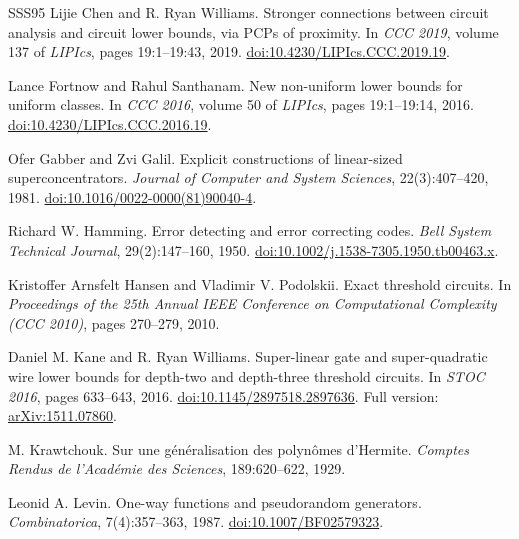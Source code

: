 \documentclass[11pt,letterpaper]{article}
\theoremstyle{definition}
\theoremstyle{remark}
\begin{document}
\begin{thebibliography}{SSS95}
Lijie Chen and R. Ryan Williams.
\newblock Stronger connections between circuit analysis and circuit lower bounds, via PCPs of proximity.
\newblock In \emph{CCC 2019}, volume 137 of \emph{LIPIcs}, pages 19:1--19:43, 2019.
\newblock \href{https://doi.org/10.4230/LIPIcs.CCC.2019.19}{doi:10.4230/LIPIcs.CCC.2019.19}.

Lance Fortnow and Rahul Santhanam.
\newblock New non-uniform lower bounds for uniform classes.
\newblock In \emph{CCC 2016}, volume 50 of \emph{LIPIcs}, pages 19:1--19:14, 2016.
\newblock \href{https://doi.org/10.4230/LIPIcs.CCC.2016.19}{doi:10.4230/LIPIcs.CCC.2016.19}.

Ofer Gabber and Zvi Galil.
\newblock Explicit constructions of linear-sized superconcentrators.
\newblock \emph{Journal of Computer and System Sciences}, 22(3):407--420, 1981.
\newblock \href{https://doi.org/10.1016/0022-0000(81)90040-4}{doi:10.1016/0022-0000(81)90040-4}.

Richard W. Hamming.
\newblock Error detecting and error correcting codes.
\newblock \emph{Bell System Technical Journal}, 29(2):147--160, 1950.
\newblock \href{https://doi.org/10.1002/j.1538-7305.1950.tb00463.x}{doi:10.1002/j.1538-7305.1950.tb00463.x}.

Kristoffer Arnsfelt Hansen and Vladimir V. Podolskii.
\newblock Exact threshold circuits.
\newblock In \emph{Proceedings of the 25th Annual IEEE Conference on
Computational Complexity (CCC 2010)}, pages 270--279, 2010.

Daniel M. Kane and R. Ryan Williams.
\newblock Super-linear gate and super-quadratic wire lower bounds for depth-two and depth-three threshold circuits.
\newblock In \emph{STOC 2016}, pages 633--643, 2016.
\newblock \href{https://doi.org/10.1145/2897518.2897636}{doi:10.1145/2897518.2897636}.
Full version: \href{https://arxiv.org/abs/1511.07860}{arXiv:1511.07860}.

M. Krawtchouk.
\newblock Sur une g\'en\'eralisation des polyn\^omes d'Hermite.
\newblock \emph{Comptes Rendus de l'Acad\'emie des Sciences}, 189:620--622, 1929.

Leonid A. Levin.
\newblock One-way functions and pseudorandom generators.
\newblock \emph{Combinatorica}, 7(4):357--363, 1987.
\newblock \href{https://doi.org/10.1007/BF02579323}{doi:10.1007/BF02579323}.


\end{thebibliography}
\end{document}
